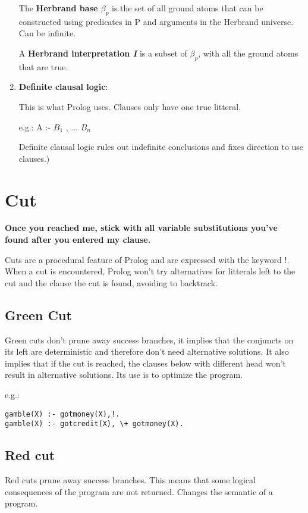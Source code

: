 \documentclass[12pt, oneside]{report}
\numberwithin{definition}{chapter}
\numberwithin{theorem}{chapter}
\numberwithin{lemma}{chapter}
\numberwithin{Rule}{chapter}
\numberwithin{equation}{chapter}
\begin{document}
\begin{enumerate}
The \textbf{Herbrand base $\beta_p$} is the set of all ground atoms that can be constructed using predicates in P and arguments in the Herbrand universe. Can be infinite.

A \textbf{Herbrand interpretation \textit{I}} is a subset of $\beta_p$, with all the ground atoms that are true.


\item \textbf{Definite clausal logic}:

This is what Prolog uses. Clauses only have one true litteral.

e.g.: A :- $B_1$ , ... $B_n$

Definite clausal logic rules out indefinite conclusions and fixes direction to use clauses.)
\end{enumerate}
\section{Cut}

\begin{displayquote}
\textbf{
Once you reached me, stick with all variable substitutions you've found after you entered my clause.}
\end{displayquote}

Cuts are a procedural feature of Prolog and are expressed with the keyword !.
When a cut is encountered, Prolog won't try alternatives for litterals left to the cut and the clause the cut is found, avoiding to backtrack.

\subsection{Green Cut}
Green cuts don't prune away success branches, it implies that the conjuncts on its left are deterministic and therefore don't need alternative solutions. It also implies that if the cut is reached, the clauses below with different head won't result in alternative solutions. Its use is to optimize the program. 

e.g.:
\begin{verbatim}
gamble(X) :- gotmoney(X),!.
gamble(X) :- gotcredit(X), \+ gotmoney(X).
\end{verbatim}

\subsection{Red cut}
Red cuts prune away success branches. This means that some logical consequences of the program are not returned. Changes the semantic of a program.
\end{document}
